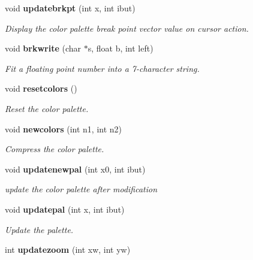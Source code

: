 \begin{CompactItemize}
void {\bf updatebrkpt} (int x, int ibut)
\begin{CompactList}\small\item\em Display the color palette break point vector value on cursor action. \item\end{CompactList}\item 
void {\bf brkwrite} (char $\ast$s, float b, int left)
\begin{CompactList}\small\item\em Fit a floating point number into a 7-character string. \item\end{CompactList}\item 
void {\bf resetcolors} ()
\begin{CompactList}\small\item\em Reset the color palette. \item\end{CompactList}\item 
void {\bf newcolors} (int n1, int n2)
\begin{CompactList}\small\item\em Compress the color palette. \item\end{CompactList}\item 
void {\bf updatenewpal} (int x0, int ibut)
\begin{CompactList}\small\item\em update the color palette after modification \item\end{CompactList}\item 
void {\bf updatepal} (int x, int ibut)
\begin{CompactList}\small\item\em Update the palette. \item\end{CompactList}\item 
int {\bf updatezoom} (int xw, int yw)\label{xtvutils_8c_a204}


\end{CompactItemize}
